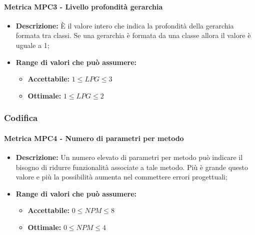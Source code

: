     \paragraph{Metrica MPC3 - Livello profondità gerarchia}
    \begin{itemize}
        \item \textbf{Descrizione:} È il valore intero che indica la profondità della gerarchia formata tra classi. Se una gerarchia è formata da una classe allora il valore è uguale a 1;
        \item \textbf{Range di valori che può assumere:}
        \begin{itemize}
            \item \textbf{Accettabile:} $1 \leq{} LPG \leq 3$
            \item \textbf{Ottimale:} $1 \leq{} LPG \leq 2$
        \end{itemize}
    \end{itemize}

\subsubsection{Codifica}  
    \paragraph{Metrica MPC4 - Numero di parametri per metodo} 
    \begin{itemize}
        \item \textbf{Descrizione:} Un numero elevato di parametri per metodo può indicare il bisogno di ridurre funzionalità associate a tale metodo. Più è grande questo valore e più la possibilità aumenta nel commettere errori progettuali;
        \item \textbf{Range di valori che può assumere:}
        \begin{itemize}
            \item \textbf{Accettabile:} $0 \leq{} NPM \leq 8$
            \item \textbf{Ottimale:} $0 \leq{} NPM \leq 4$
        \end{itemize}
    \end{itemize}

